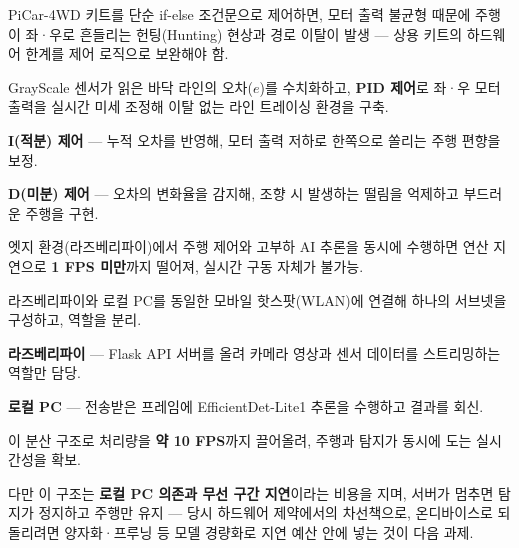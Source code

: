 
\begin{substeps}
  \item PiCar-4WD 키트를 단순 if-else 조건문으로 제어하면, 모터 출력 불균형 때문에 주행이 좌·우로 흔들리는 헌팅(Hunting) 현상과 경로 이탈이 발생 --- 상용 키트의 하드웨어 한계를 제어 로직으로 보완해야 함.
  \item GrayScale 센서가 읽은 바닥 라인의 오차($e$)를 수치화하고, \textbf{PID 제어}로 좌·우 모터 출력을 실시간 미세 조정해 이탈 없는 라인 트레이싱 환경을 구축.
  \begin{substeps2}
    \item \textbf{I(적분) 제어} --- 누적 오차를 반영해, 모터 출력 저하로 한쪽으로 쏠리는 주행 편향을 보정.
    \item \textbf{D(미분) 제어} --- 오차의 변화율을 감지해, 조향 시 발생하는 떨림을 억제하고 부드러운 주행을 구현.
  \end{substeps2}
\end{substeps}

\begin{substeps}
  \item 엣지 환경(라즈베리파이)에서 주행 제어와 고부하 AI 추론을 동시에 수행하면 연산 지연으로 \textbf{1 FPS 미만}까지 떨어져, 실시간 구동 자체가 불가능.
  \item 라즈베리파이와 로컬 PC를 동일한 모바일 핫스팟(WLAN)에 연결해 하나의 서브넷을 구성하고, 역할을 분리.
  \begin{substeps2}
    \item \textbf{라즈베리파이} --- Flask API 서버를 올려 카메라 영상과 센서 데이터를 스트리밍하는 역할만 담당.
    \item \textbf{로컬 PC} --- 전송받은 프레임에 EfficientDet-Lite1 추론을 수행하고 결과를 회신.
  \end{substeps2}
  \item 이 분산 구조로 처리량을 \textbf{약 10 FPS}까지 끌어올려, 주행과 탐지가 동시에 도는 실시간성을 확보.
  \item 다만 이 구조는 \textbf{로컬 PC 의존과 무선 구간 지연}이라는 비용을 지며, 서버가 멈추면 탐지가 정지하고 주행만 유지 --- 당시 하드웨어 제약에서의 차선책으로, 온디바이스로 되돌리려면 양자화·프루닝 등 모델 경량화로 지연 예산 안에 넣는 것이 다음 과제.
\end{substeps}

